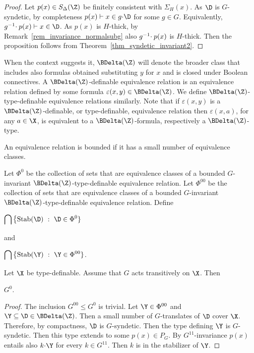 \begin{proof}
  Let $p(x)\in S_\Delta(\Z)$ be finitely consistent with $\Sigma_H(x)$.
  As $\D$ is $G$-syndetic, by completeness $p(x)\vdash x\in g{\cdot}\D$ for some $g\in G$.
  Equivalently, $g^{-1}\kern-.5ex\cdot p(x)\vdash x\in\D$.
  As $p(x)$ is $H$-thick, by Remark~\ref{rem_invariance_normalsubg} also $g^{-1}\kern-.5ex\cdot p(x)$ is $H$-thick.
  Then the proposition follows from Theorem~\ref{thm_syndetic_invariant2}.
\end{proof}

When the context suggests it, $\BDelta(\Z)$ will denote the broader class that includes also formulas obtained substituting $y$ for $x$ and is closed under Boolean connectives.
A $\BDelta(\Z)$-definable equivalence relation is an equivalence relation defined by some formula $\varepsilon(x,y)\in\BDelta(\Z)$.
We define $\BDelta(\Z)$-type-definable equivalence relations similarly.
Note that if $\varepsilon(x,y)$ is a $\BDelta(\Z)$-definable, or type-definable, equivalence relation then $\varepsilon(x,a)$, for any $a\in\X$, is equivalent to a $\BDelta(\Z)$-formula, respectively a $\BDelta(\Z)$-type.

An equivalence relation is bounded if it has a small number of equivalence classes.

\begin{definition}\label{def_G00}
  Let $\Phi^0$ be the collection of sets that are equivalence classes of a bounded $G$-invariant $\BDelta(\Z)$-type-definable equivalence relation.
  Let $\Phi^{00}$ be the collection of sets that are equivalence classes of a bounded $G$-invariant $\BDelta(\Z)$-type-definable equivalence relation.
  Define
  \smallskip

  \medrel{=}$\displaystyle\bigcap\big\{{\rm Stab}(\D)\ :\  \D\in\Phi^0\}$

  and

  \medrel{=}$\displaystyle\bigcap\big\{{\rm Stab}(\Y)\ :\  \Y\in\Phi^{00}\}$.

\end{definition}

\begin{proposition}
  Let $\X$ be type-definable.
  Assume that $G$ acts transitively on $\X$.
  Then 
  
  \medrel{\leq}$G^0$.
\end{proposition}

\begin{proof}
  The inclusion $G^{00}\leq G^0$ is trivial.
  Let $\Y\in\Phi^{00}$ and $\Y\subseteq\D\in\BDelta(\Z)$.
  Then a small number of $G$-translates of $\D$ cover $\X$.
  Therefore, by compactness, $\D$ is $G$-syndetic.
  Then the type defining $\Y$ is $G$-syndetic.
  Then this type extends to some $p(x)\in P_G$.
  By $G^{1\!1}$-in\-variance $p(x)$ entails also $k{\cdot}\Y$ for every $k\in G^{1\!1}$.
  Then $k$ is in the stabilizer of $\Y$.
\end{proof}



